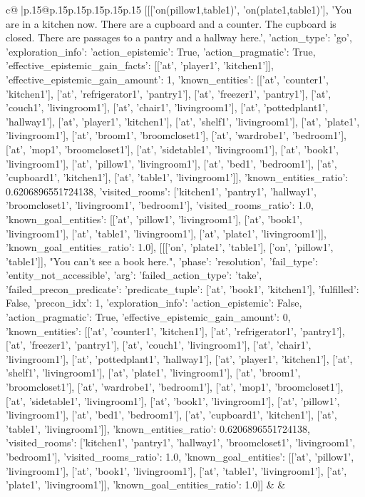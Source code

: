 \documentclass{article}
\begin{document}
{\begin{supertabular}{c@{$\;$}|p{.15\linewidth}@{}p{.15\linewidth}p{.15\linewidth}p{.15\linewidth}p{.15\linewidth}p{.15\linewidth}}
{{{	 [[['on(pillow1,table1)', 'on(plate1,table1)'], 'You are in a kitchen now. There are a cupboard and a counter. The cupboard is closed. There are passages to a pantry and a hallway here.', {'action_type': 'go', 'exploration_info': {'action_epistemic': True, 'action_pragmatic': True, 'effective_epistemic_gain_facts': [['at', 'player1', 'kitchen1']], 'effective_epistemic_gain_amount': 1, 'known_entities': [['at', 'counter1', 'kitchen1'], ['at', 'refrigerator1', 'pantry1'], ['at', 'freezer1', 'pantry1'], ['at', 'couch1', 'livingroom1'], ['at', 'chair1', 'livingroom1'], ['at', 'pottedplant1', 'hallway1'], ['at', 'player1', 'kitchen1'], ['at', 'shelf1', 'livingroom1'], ['at', 'plate1', 'livingroom1'], ['at', 'broom1', 'broomcloset1'], ['at', 'wardrobe1', 'bedroom1'], ['at', 'mop1', 'broomcloset1'], ['at', 'sidetable1', 'livingroom1'], ['at', 'book1', 'livingroom1'], ['at', 'pillow1', 'livingroom1'], ['at', 'bed1', 'bedroom1'], ['at', 'cupboard1', 'kitchen1'], ['at', 'table1', 'livingroom1']], 'known_entities_ratio': 0.6206896551724138, 'visited_rooms': ['kitchen1', 'pantry1', 'hallway1', 'broomcloset1', 'livingroom1', 'bedroom1'], 'visited_rooms_ratio': 1.0, 'known_goal_entities': [['at', 'pillow1', 'livingroom1'], ['at', 'book1', 'livingroom1'], ['at', 'table1', 'livingroom1'], ['at', 'plate1', 'livingroom1']], 'known_goal_entities_ratio': 1.0}}], [[['on', 'plate1', 'table1'], ['on', 'pillow1', 'table1']], "You can't see a book here.", {'phase': 'resolution', 'fail_type': 'entity_not_accessible', 'arg': {'failed_action_type': 'take', 'failed_precon_predicate': {'predicate_tuple': ['at', 'book1', 'kitchen1'], 'fulfilled': False, 'precon_idx': 1}}, 'exploration_info': {'action_epistemic': False, 'action_pragmatic': True, 'effective_epistemic_gain_amount': 0, 'known_entities': [['at', 'counter1', 'kitchen1'], ['at', 'refrigerator1', 'pantry1'], ['at', 'freezer1', 'pantry1'], ['at', 'couch1', 'livingroom1'], ['at', 'chair1', 'livingroom1'], ['at', 'pottedplant1', 'hallway1'], ['at', 'player1', 'kitchen1'], ['at', 'shelf1', 'livingroom1'], ['at', 'plate1', 'livingroom1'], ['at', 'broom1', 'broomcloset1'], ['at', 'wardrobe1', 'bedroom1'], ['at', 'mop1', 'broomcloset1'], ['at', 'sidetable1', 'livingroom1'], ['at', 'book1', 'livingroom1'], ['at', 'pillow1', 'livingroom1'], ['at', 'bed1', 'bedroom1'], ['at', 'cupboard1', 'kitchen1'], ['at', 'table1', 'livingroom1']], 'known_entities_ratio': 0.6206896551724138, 'visited_rooms': ['kitchen1', 'pantry1', 'hallway1', 'broomcloset1', 'livingroom1', 'bedroom1'], 'visited_rooms_ratio': 1.0, 'known_goal_entities': [['at', 'pillow1', 'livingroom1'], ['at', 'book1', 'livingroom1'], ['at', 'table1', 'livingroom1'], ['at', 'plate1', 'livingroom1']], 'known_goal_entities_ratio': 1.0}}]] 
	  } 
	   } 
	   } 
	 & & \\ 
 


\end{supertabular}}
\end{document}
